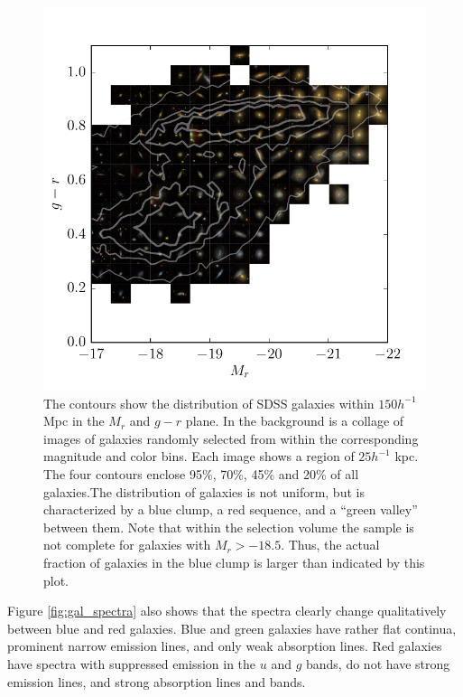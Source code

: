 \begin{figure}[!ht]
\centerline{
\includegraphics[scale=1.3]{fig/Mrgr_collage.pdf}}
\vspace{-5mm}
\caption{The contours show the distribution of SDSS galaxies within $150h^{-1}$ Mpc in the $M_r$ and $g-r$ plane. In the background is a collage of images of galaxies randomly selected from within the corresponding magnitude and color bins. Each image shows a region of $25h^{-1}$ kpc. The four contours enclose 95\%, 70\%, 45\% and 20\% of all galaxies.The distribution of galaxies is not uniform, but is characterized by a blue clump, a red sequence, and a ``green valley'' between them. Note that within the selection volume the sample is not complete for galaxies with $M_r> -18.5$. Thus, the actual fraction of galaxies in the blue clump is larger than indicated by this plot. \label{fig:Mrgr_collage}}
\end{figure}

Figure \ref{fig:gal_spectra}  also shows that the spectra clearly change qualitatively between blue and red galaxies. Blue and green galaxies have rather flat continua, prominent narrow emission lines, and only weak absorption lines. Red galaxies have spectra with suppressed emission in the $u$ and $g$ bands, do not have strong emission lines, and strong absorption lines and bands. 

